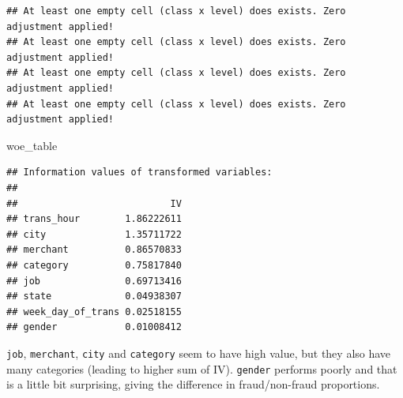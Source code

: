 \documentclass[
]{report}
\newenvironment{Shaded}{\begin{snugshade}}{\end{snugshade}}
\newcommand{\AttributeTok}[1]{\textcolor[rgb]{0.77,0.63,0.00}{#1}}
\newcommand{\ControlFlowTok}[1]{\textcolor[rgb]{0.13,0.29,0.53}{\textbf{#1}}}
\newcommand{\DecValTok}[1]{\textcolor[rgb]{0.00,0.00,0.81}{#1}}
\newcommand{\FunctionTok}[1]{\textcolor[rgb]{0.00,0.00,0.00}{#1}}
\newcommand{\NormalTok}[1]{#1}
\newcommand{\OtherTok}[1]{\textcolor[rgb]{0.56,0.35,0.01}{#1}}
\newcommand{\SpecialCharTok}[1]{\textcolor[rgb]{0.00,0.00,0.00}{#1}}
\newcommand{\StringTok}[1]{\textcolor[rgb]{0.31,0.60,0.02}{#1}}
\begin{document}
\begin{Shaded}
\end{Shaded}

\begin{verbatim}
## At least one empty cell (class x level) does exists. Zero adjustment applied!
## At least one empty cell (class x level) does exists. Zero adjustment applied!
## At least one empty cell (class x level) does exists. Zero adjustment applied!
## At least one empty cell (class x level) does exists. Zero adjustment applied!
\end{verbatim}

\begin{Shaded}
\begin{Highlighting}[]
\NormalTok{woe\_table}
\end{Highlighting}
\end{Shaded}

\begin{verbatim}
## Information values of transformed variables: 
## 
##                           IV
## trans_hour        1.86222611
## city              1.35711722
## merchant          0.86570833
## category          0.75817840
## job               0.69713416
## state             0.04938307
## week_day_of_trans 0.02518155
## gender            0.01008412
\end{verbatim}

\texttt{job}, \texttt{merchant}, \texttt{city} and \texttt{category}
seem to have high value, but they also have many categories (leading to
higher sum of IV). \texttt{gender} performs poorly and that is a little
bit surprising, giving the difference in fraud/non-fraud proportions.
\end{document}
